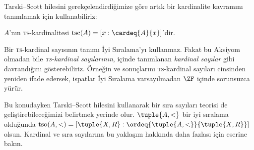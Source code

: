 Tarski--Scott hilesini gerekçelendirdiğimize göre artık bir kardinalite
kavramını tanımlamak için kullanabiliriz:

\begin{defn}
$A$'nın \textsc{ts}-kardinalitesi
$\text{tsc}(A)=[x:\cardeq{A}{x}]$'dir.
\end{defn}

Bir \textsc{ts}-kardinal sayısının tanımı İyi Sıralama'yı kullanmaz.
Fakat bu Aksiyom olmadan bile \emph{\textsc{ts}-kardinal sayılarının},
 içinde tanımlanan
\emph{kardinal sayılar} gibi davrandığını gösterebiliriz. Örneğin
 ve
 sonuçlarını
\textsc{ts}-kardinal sayıları cinsinden yeniden ifade edersek, ispatlar
İyi Sıralama varsayılmadan $\ZF$ içinde sorunsuzca yürür.

Bu konudayken Tarski--Scott hilesini kullanarak bir sıra sayıları teorisi
de geliştirebileceğimizi belirtmek yerinde olur. $\tuple{A,<}$ bir iyi
sıralama olduğunda
$\text{tso}(A,<)=[\tuple{X,R}:\ordeq{\tuple{A,<}}{\tuple{X,R}}]$ olsun.
Kardinal ve sıra sayılarına bu yaklaşım hakkında daha fazlası için
\citet[chs.~9--12]{Potter2004} eserine bakın.

